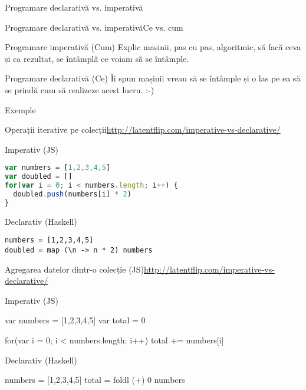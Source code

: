 \documentclass[handout,xcolor=pdftex,romanian,colorlinks]{beamer}
\begin{document}
\begin{section}{Programare declarativă vs. imperativă}
\begin{frame}{Programare declarativă vs. imperativă}{Ce vs. cum}
\begin{block}{Programare imperativă (Cum)}
Explic mașinii, pas cu pas, algoritmic,  să facă ceva și ca rezultat, se întâmplă \alert{ce} voiam să se întâmple.
\end{block}

\vfill\begin{block}{Programare declarativă (Ce)}
Îi spun mașinii  vreau să se întâmple și o las pe ea să se prindă \alert{cum} să realizeze acest lucru. :-)
\end{block}
\end{frame}

\begin{subsection}{Exemple}
\begin{frame}[fragile]{Operații iterative pe colecții}{\url{http://latentflip.com/imperative-vs-declarative/}}
\begin{block}{Imperativ (JS)}
{\small
\begin{lstlisting}[language=JavaScript]
var numbers = [1,2,3,4,5]
var doubled = []
for(var i = 0; i < numbers.length; i++) {
  doubled.push(numbers[i] * 2)
}
\end{lstlisting}}
\end{block}

\begin{block}{Declarativ (Haskell)}
{\small
\begin{lstlisting}
numbers = [1,2,3,4,5]
doubled = map (\n -> n * 2) numbers
\end{lstlisting}}
\end{block}
\end{frame}

\begin{frame}[fragile]{Agregarea datelor dintr-o colecție (JS)}{\url{http://latentflip.com/imperative-vs-declarative/}}
\begin{block}{Imperativ (JS)}
{\small
\begin{asciijs}
var numbers = [1,2,3,4,5]
var total = 0

for(var i = 0; i < numbers.length; i++) {
  total += numbers[i]
}
\end{asciijs}}
\end{block}

\begin{block}{Declarativ (Haskell)}
{\small
\begin{asciihs}
numbers = [1,2,3,4,5]
total = foldl (+) 0 numbers
\end{asciihs}}
\end{block}
\end{frame}


\end{subsection}
\end{section}
\end{document}

